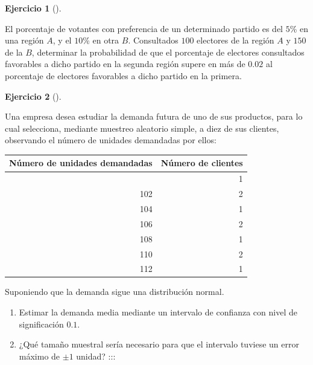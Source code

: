 \documentclass[
  a4paper,
]{scrreport}
\providecommand{\tightlist}{%
  \setlength{\itemsep}{0pt}\setlength{\parskip}{0pt}}\usepackage{longtable,booktabs,array}
\theoremstyle{definition}
\newtheorem{exercise}{Ejercicio}[chapter]
\theoremstyle{remark}
\begin{document}
\begin{exercise}[]\protect\hypertarget{exr-diferencia-proporciones-votos}{}\label{exr-diferencia-proporciones-votos}

El porcentaje de votantes con preferencia de un determinado partido es
del \(5\)\% en una región \(A\), y el \(10\)\% en otra \(B\).
Consultados \(100\) electores de la región \(A\) y \(150\) de la \(B\),
determinar la probabilidad de que el porcentaje de electores consultados
favorables a dicho partido en la segunda región supere en más de
\(0.02\) al porcentaje de electores favorables a dicho partido en la
primera.

\end{exercise}

\begin{exercise}[]\protect\hypertarget{exr-intervalo-confianza-media-demanda}{}\label{exr-intervalo-confianza-media-demanda}

Una empresa desea estudiar la demanda futura de uno de sus productos,
para lo cual selecciona, mediante muestreo aleatorio simple, a diez de
sus clientes, observando el número de unidades demandadas por ellos:

\begin{longtable}[]{@{}rr@{}}
\toprule\noalign{}
Número de unidades demandadas & Número de clientes \\
\midrule\noalign{}
\endhead
\bottomrule\noalign{}
\endlastfoot
100 & 1 \\
102 & 2 \\
104 & 1 \\
106 & 2 \\
108 & 1 \\
110 & 2 \\
112 & 1 \\
\end{longtable}

\end{exercise}

Suponiendo que la demanda sigue una distribución normal.

\begin{enumerate}
\def\labelenumi{\alph{enumi}.}
\tightlist
\item
  Estimar la demanda media mediante un intervalo de confianza con nivel
  de significación \(0.1\).
\item
  ¿Qué tamaño muestral sería necesario para que el intervalo tuviese un
  error máximo de \(\pm 1\) unidad? :::
\end{enumerate}
\end{document}
